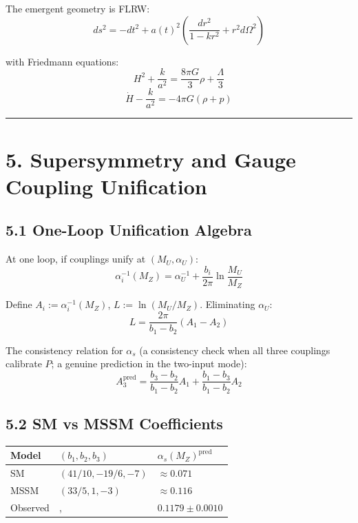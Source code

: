 The emergent geometry is FLRW: \[ds^2 = -dt^2 + a(t)^2 \left(\frac{dr^2}{1-kr^2} + r^2 d\Omega^2\right)\]

with Friedmann equations: \[H^2 + \frac{k}{a^2} = \frac{8\pi G}{3}\rho + \frac{\Lambda}{3}\] \[\dot{H} - \frac{k}{a^2} = -4\pi G(\rho + p)\]

\begin{center}\rule{0.5\linewidth}{0.5pt}\end{center}

\section{5. Supersymmetry and Gauge Coupling Unification}\label{5-supersymmetry-and-gauge-coupling-unification}

\subsection{5.1 One-Loop Unification Algebra}\label{51-one-loop-unification-algebra}

At one loop, if couplings unify at \((M_U, \alpha_U)\): \[\alpha_i^{-1}(M_Z) = \alpha_U^{-1} + \frac{b_i}{2\pi}\ln\frac{M_U}{M_Z}\]

Define \(A_i := \alpha_i^{-1}(M_Z)\), \(L := \ln(M_U/M_Z)\). Eliminating \(\alpha_U\): \[L = \frac{2\pi}{b_1 - b_2}(A_1 - A_2)\]

The consistency relation for \(\alpha_s\) (a consistency check when all three couplings calibrate $P$; a genuine prediction in the two-input mode): \[A_3^{\text{pred}} = \frac{b_3 - b_2}{b_1 - b_2}A_1 + \frac{b_1 - b_3}{b_1 - b_2}A_2\]

\subsection{5.2 SM vs MSSM Coefficients}\label{52-sm-vs-mssm-coefficients}

{\def\LTcaptype{none} %
\begin{longtable}[]{@{}>{\RaggedRight\arraybackslash}p{}>{\RaggedRight\arraybackslash}p{}>{\RaggedRight\arraybackslash}p{}@{}}
\toprule\noalign{}
Model & \((b_1, b_2, b_3)\) & \(\alpha_s(M_Z)^{\text{pred}}\) \\
\midrule\noalign{}
\endhead
\bottomrule\noalign{}
\endlastfoot
SM & \((41/10, -19/6, -7)\) & \(\approx 0.071\) \\
MSSM & \((33/5, 1, -3)\) & \(\approx 0.116\) \\
Observed & , & \(0.1179 \pm 0.0010\) \\
\end{longtable}
}

